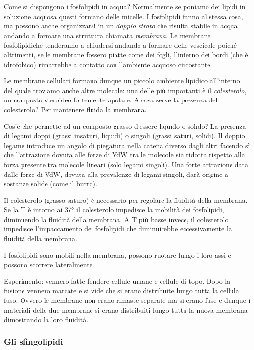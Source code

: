 \documentclass[]{article}
\begin{document}
Come si dispongono i fosfolipidi in acqua? Normalmente se poniamo dei
lipidi in soluzione acquosa questi formano delle micelle. I fosfolipidi
fanno al stessa cosa, ma possono anche organizzarsi in un \emph{doppio
strato} che risulta stabile in acqua andando a formare una struttura
chiamata \emph{membrana}. Le membrane fosfolipidiche tenderanno a
chiudersi andando a formare delle vescicole poiché altrimenti, se le
membrane fossero piatte come dei fogli, l'interno dei bordi (che è
idrofobico) rimarrebbe a contatto con l'ambiente acquoso circostante.

Le membrane cellulari formano dunque un piccolo ambiente lipidico
all'interno del quale troviamo anche altre molecole: una delle più
importanti è il \emph{colesterolo}, un composto steroideo fortemente
apolare. A cosa serve la presenza del colesterolo? Per mantenere fluida
la membrana.

Cos'è che permette ad un composto grasso d'essere liquido o solido? La
presenza di legami doppi (grassi insaturi, liquidi) o singoli (grassi
saturi, solidi). Il doppio legame introduce un angolo di piegatura nella
catena diverso dagli altri facendo sì che l'attrazione dovuta alle forze
di VdW tra le molecole sia ridotta rispetto alla forza presente tra
molecole lineari (solo legami singoli). Una forte attrazione data dalle
forze di VdW, dovuta alla prevalenze di legami singoli, darà origine a
sostanze solide (come il burro).

Il colesterolo (grasso saturo) è necessario per regolare la fluidità
della membrana. Se la T è intorno ai 37° il colesterolo impedisce la
mobilità dei fosfolipidi, diminuendo la fluidità della membrana. A T più
basse invece, il colesterolo impedisce l'impaccamento dei fosfolipidi
che diminuirebbe eccessivamente la fluidità della membrana.

I fosfolipidi sono mobili nella membrana, possono ruotare lungo i loro
assi e possono scorrere lateralmente.

Esperimento: vennero fatte fondere cellule umane e cellule di topo. Dopo
la fusione vennero marcate e si vide che si erano distribuite lungo
tutta la cellula fuso. Ovvero le membrane non erano rimaste separate ma
si erano fuse e dunque i materiali delle due membrane si erano
distribuiti lungo tutta la nuova membrana dimostrando la loro fluidità.

\subsubsection{Gli sfingolipidi}\label{gli-sfingolipidi}
\end{document}

